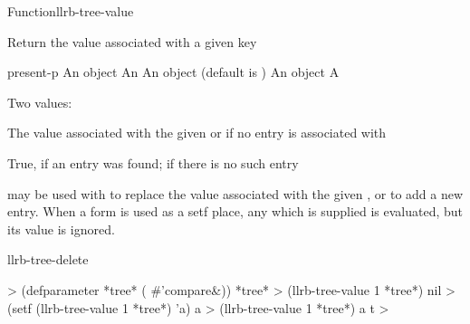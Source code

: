 \documentclass[10pt,twoside,english,pdftex]{article}
\begin{document}
\begin{functiondoc}{Function}{llrb-tree-value}{
    }
%
%

\fnsyntax

\fnpurpose Return the value associated with a given key

\fnsetf
{}%
    {\returns{} }

\fnpackage {}

\fnmodule {}

\fnargs
\begin{args}{present-p}
\arg[key] An object
 An 
\arg[default] An object (default is \nil)
\arg[value] An object 
\arg[present-p] A 
\end{args}

\fnreturns Two values:
\begin{tightitemize}
\item The value associated with the given  or  if no
  entry is associated with 
\item True, if an entry was found; \nil{} if there is no such entry
\end{tightitemize}



\fndescription
%
 may be used with  to replace the
value associated with the given , or to add a new entry. When a
 form is used as a setf place, any
 which is supplied is evaluated, but its value is ignored.

\begin{alsos}{llrb-tree-delete}
\end{alsos}

\fnexample
%
\W\supp
\begin{example}
  > (defparameter *tree* ( #'compare\&))
  *tree*
  > (llrb-tree-value 1 *tree*)
  nil
  > (setf (llrb-tree-value 1 *tree*) 'a)
  a
  > (llrb-tree-value 1 *tree*)
  a
  t
  > 
\end{example}

\end{functiondoc}
\end{document}
